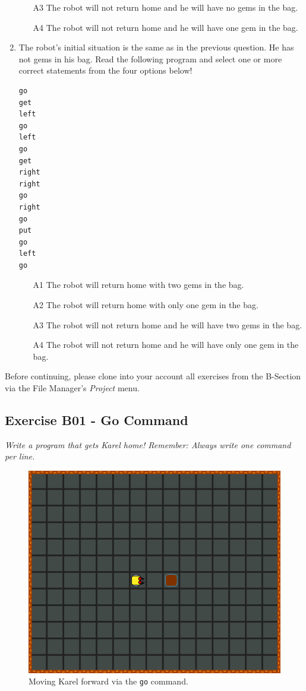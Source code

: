 \documentclass[article,A4,12pt]{llncs}
\begin{document}
\begin{enumerate}
\begin{enumerate}
\item[A3] The robot will not return home and he will have no gems in the bag.
\item[A4] The robot will not return home and he will have one gem in the bag.
\end{enumerate}
\item The robot's initial situation is the same as in the previous question. He has not gems 
in his bag. Read the following program and select one or more correct statements from the four options below!
\begin{verbatim}
go
get
left
go
left
go
get
right
right
go
right
go
put
go
left 
go
\end{verbatim}
\begin{enumerate}
\item[A1] The robot will return home with two gems in the bag.
\item[A2] The robot will return home with only one gem in the bag.
\item[A3] The robot will not return home and he will have two gems in the bag.
\item[A4] The robot will not return home and he will have only one gem in the bag.
\end{enumerate}
\end{enumerate}
Before continuing, please clone into your account all exercises from the B-Section via the File Manager's {\em Project}
menu.

\newpage
\subsection{Exercise B01 - Go Command}

{\em Write a program that gets Karel home! Remember: Always write one command per line.}

\begin{figure}[!ht]
\begin{center}
\includegraphics[height=0.4\textwidth]{img/b01.png}
\end{center}
\vspace{-4mm}
\caption{Moving Karel forward via the {\tt go} command.}
\label{fig:b01}
\vspace{-4mm}
\end{figure}
\noindent
\end{document}
